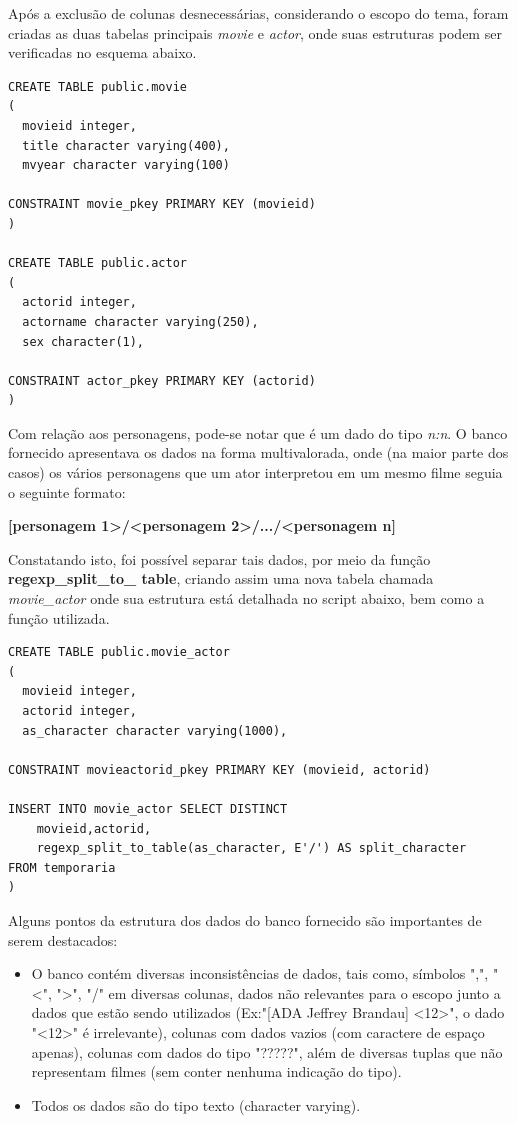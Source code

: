 \documentclass[
	12pt,				%
	oneside,			%
	a4paper,			%
	brazil				%
	]{abntex2}
\begin{document}
Após a exclusão de colunas desnecessárias, considerando o escopo do tema, foram criadas as duas tabelas principais \textit{movie} e \textit{actor}, onde suas estruturas podem ser verificadas no esquema abaixo.
\\
\begin{lstlisting}
CREATE TABLE public.movie
(
  movieid integer,
  title character varying(400),
  mvyear character varying(100)

CONSTRAINT movie_pkey PRIMARY KEY (movieid)
)

CREATE TABLE public.actor
(
  actorid integer,
  actorname character varying(250),
  sex character(1),

CONSTRAINT actor_pkey PRIMARY KEY (actorid)
)
\end{lstlisting}

Com relação aos personagens, pode-se notar que é um dado do tipo \textit{n:n}. O banco fornecido apresentava os dados na forma multivalorada, onde (na maior parte dos casos) os vários personagens que um ator interpretou em um mesmo filme seguia o seguinte formato: 

\begin{center}
\textbf{[personagem 1>/<personagem 2>/.../<personagem n]}
\newline
\end{center}


Constatando isto, foi possível separar tais dados, por meio da função \textbf{regexp\_split\_to\_ table}, criando assim uma nova tabela chamada \textit{movie\_actor} onde sua estrutura está detalhada no script abaixo, bem como a função utilizada. 
\\

\begin{lstlisting}
CREATE TABLE public.movie_actor
(
  movieid integer,
  actorid integer,
  as_character character varying(1000),

CONSTRAINT movieactorid_pkey PRIMARY KEY (movieid, actorid)

INSERT INTO movie_actor SELECT DISTINCT
    movieid,actorid, 
    regexp_split_to_table(as_character, E'/') AS split_character
FROM temporaria
)
\end{lstlisting}

Alguns pontos da estrutura dos dados do banco fornecido são importantes de serem destacados:
\begin{itemize}

\item O banco contém diversas inconsistências de dados, tais como, símbolos ",", "<", ">", "/"  em diversas colunas, dados não relevantes para o escopo junto a dados que estão sendo utilizados (Ex:"[ADA Jeffrey Brandau]  <12>", o dado "<12>"  é irrelevante), colunas com dados vazios (com caractere de espaço apenas), colunas com dados do tipo "?????", além de diversas tuplas que não representam filmes (sem conter nenhuma indicação do tipo).

\item Todos os dados são do tipo texto (character varying).

\end{itemize}
\end{document}
